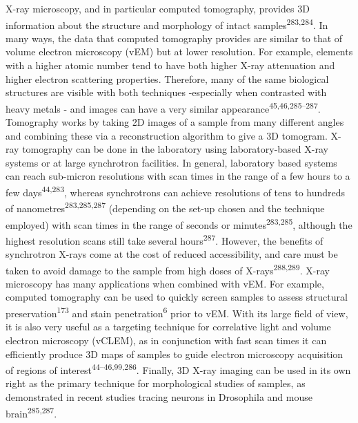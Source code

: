 \documentclass{article}
\begin{document}
X-ray microscopy, and in particular computed tomography, provides 3D information about the structure and morphology of intact samples\textsuperscript{283,284}. In many ways, the data that computed tomography provides are similar to that of volume electron microscopy (vEM) but at lower resolution. For example, elements with a higher atomic number tend to have both higher X-ray attenuation and higher electron scattering properties. Therefore, many of the same biological structures are visible with both techniques -especially when contrasted with heavy metals - and images can have a very similar appearance\textsuperscript{45,46,285–287}. Tomography works by taking 2D images of a sample from many different angles and combining these via a reconstruction algorithm to give a 3D tomogram. X-ray tomography can be done in the laboratory using laboratory-based X-ray systems or at large synchrotron facilities. In general, laboratory based systems can reach sub-micron resolutions with scan times in the range of a few hours to a few days\textsuperscript{44,283}, whereas synchrotrons can achieve resolutions of tens to hundreds of nanometres\textsuperscript{283,285,287} (depending on the set-up chosen and the technique employed) with scan times in the range of seconds or minutes\textsuperscript{283,285}, although the highest resolution scans still take several hours\textsuperscript{287}. However, the benefits of synchrotron X-rays come at the cost of reduced accessibility, and care must be taken to avoid damage to the sample from high doses of X-rays\textsuperscript{288,289}. X-ray microscopy has many applications when combined with vEM. For example, computed tomography can be used to quickly screen samples to assess structural preservation\textsuperscript{173} and stain penetration\textsuperscript{6} prior to vEM. With its large field of view, it is also very useful as a targeting technique for correlative light and volume electron microscopy (vCLEM), as in conjunction with fast scan times it can efficiently produce 3D maps of samples to guide electron microscopy acquisition of regions of interest\textsuperscript{44–46,99,286}. Finally, 3D X-ray imaging can be used in its own right as the primary technique for morphological studies of samples, as demonstrated in recent studies tracing neurons in Drosophila and mouse brain\textsuperscript{285,287}.
\end{document}
